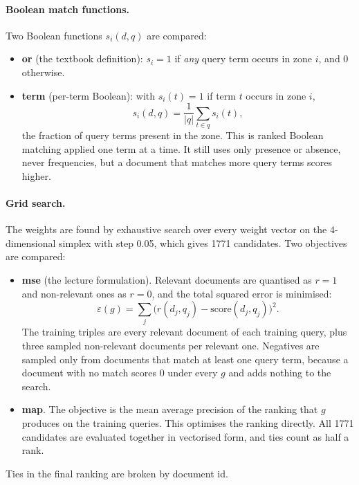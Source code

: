 \documentclass[11pt,a4paper]{article}
\begin{document}
\paragraph{Boolean match functions.} Two Boolean functions $s_i(d,q)$ are compared:
\begin{itemize}
  \item \textbf{or} (the textbook definition): $s_i = 1$ if \emph{any} query term occurs in
  zone $i$, and 0 otherwise.
  \item \textbf{term} (per-term Boolean): with $s_i(t)=1$ if term $t$ occurs in zone $i$,
  \begin{equation}
    s_i(d,q) = \frac{1}{|q|}\sum_{t\in q} s_i(t),
  \end{equation}
  the fraction of query terms present in the zone. This is ranked Boolean matching applied
  one term at a time. It still uses only presence or absence, never frequencies, but a
  document that matches more query terms scores higher.
\end{itemize}

\paragraph{Grid search.} The weights are found by exhaustive search over every weight
vector on the 4-dimensional simplex with step 0.05, which gives 1771 candidates. Two
objectives are compared:
\begin{itemize}
  \item \textbf{mse} (the lecture formulation). Relevant documents are quantised as $r=1$
  and non-relevant ones as $r=0$, and the total squared error is minimised:
  \begin{equation}
    \varepsilon(g) = \sum_j \bigl(r(d_j,q_j) - \text{score}(d_j,q_j)\bigr)^2 .
  \end{equation}
  The training triples are every relevant document of each training query, plus three
  sampled non-relevant documents per relevant one. Negatives are sampled only from documents
  that match at least one query term, because a document with no match scores 0 under every
  $g$ and adds nothing to the search.
  \item \textbf{map}. The objective is the mean average precision of the ranking that $g$
  produces on the training queries. This optimises the ranking directly. All 1771
  candidates are evaluated together in vectorised form, and ties count as half a rank.
\end{itemize}
Ties in the final ranking are broken by document id.
\end{document}
